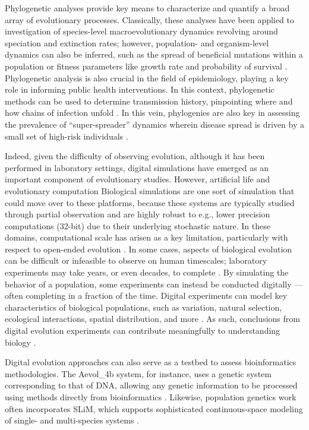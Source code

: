 Phylogenetic analyses provide key means to characterize and quantify a broad array of evolutionary processes.
Classically, these analyses have been applied to investigation of species-level macroevolutionary dynamics revolving around speciation and extinction rates; however, population- and organism-level dynamics can also be inferred, such as the spread of beneficial mutations within a population or fitness parameters like growth rate and probability of survival \citep{genthon2023cell, levy2015quantitative, stadler2013recovering}.
Phylogenetic analysis is also crucial in the field of epidemiology, playing a key role in informing public health interventions.
In this context, phylogenetic methods can be used to determine transmission history, pinpointing where and how chains of infection unfold \citep{wang2020role}.
In this vein, phylogenies are also key in assessing the prevalence of  ``super-spreader'' dynamics wherein disease spread is driven by a small set of high-risk individuals \citep{colijn2014phylogenetic}.


Indeed, given the difficulty of observing evolution, although it has been performed in laboratory settings, digital simulations have emerged as an important component of evolutionary studies.
However, artificial life and evolutionary computation
Biological simulations are one sort of simulation that could move over to these platforms, because these systems are typically studied through partial observation and are highly robust to e.g., lower precision computations (32-bit) due to their underlying stochastic nature.
In these domains, computational scale has arisen as a key limitation, particularly with respect to open-ended evolution \citep{TODO}.
In some cases, aspects of biological evolution can be difficult or infeasible to observe on human timescales; laboratory experiments may take years, or even decades, to complete \citep{wiser2013long,Stroud2025}.
By simulating the behavior of a population, some experiments can instead be conducted digitally --- often completing in a fraction of the time.
Digital experiments can model key characteristics of biological populations, such as variation, natural selection, ecological interactions, spatial distribution, and more \citep{dolson2021digital,haller2023slim}.
As such, conclusions from digital evolution experiments can contribute meaningfully to understanding biology \citep{pennock2007models}.

Digital evolution approaches can also serve as a testbed to assess bioinformatics methodologies.
The Aevol\_4b system, for instance, uses a genetic system corresponding to that of DNA, allowing any genetic information to be processed using methods directly from bioinformatics \citep{daudey2024aevol}.
Likewise, population genetics work often incorporates SLiM, which supports sophisticated continuous-space modeling of single- and multi-species systems \citep{haller2023slim}.

